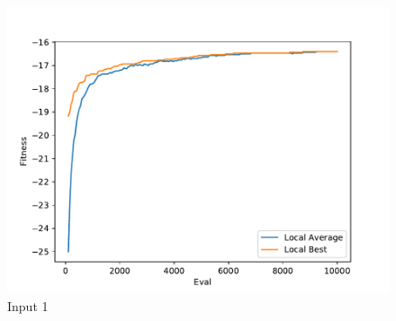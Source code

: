\documentclass{standalone}
\begin{document}
\begin{figure}[!htb]
	\caption{Input 1}
	\label{fig:graph_1002}
	\includegraphics[width=\textwidth]{../graphs/graphs/1002.pdf}
\end{figure}
\end{document}

